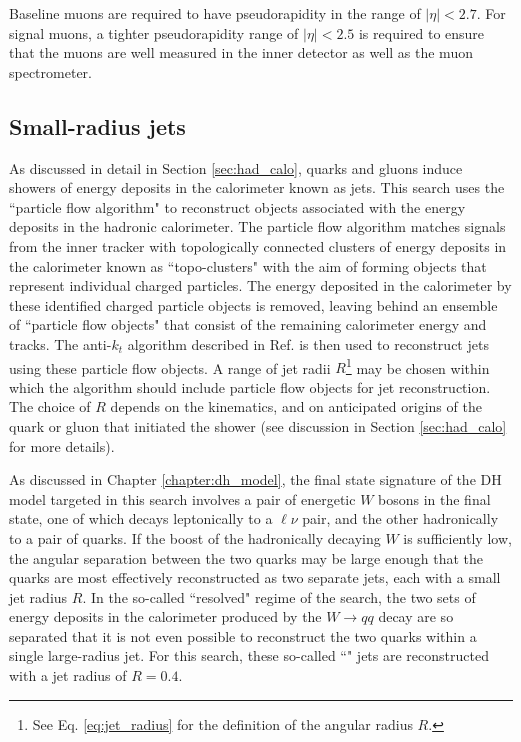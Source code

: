 Baseline muons are required to have pseudorapidity in the range of  \(|\eta| < 2.7\). For signal muons, a tighter pseudorapidity range of \(|\eta| < 2.5\) is required to ensure that the muons are well measured in the inner detector as well as the muon spectrometer. 

\subsection{Small-radius \aktfour jets}
\label{sec:atk4_jets}

As discussed in detail in Section \ref{sec:had_calo}, quarks and gluons induce showers of energy deposits in the calorimeter known as jets. This search uses the ``particle flow algorithm" \cite{PERF-2015-09} to reconstruct objects associated with the energy deposits in the hadronic calorimeter. The particle flow algorithm matches signals from the inner tracker with topologically connected clusters of energy deposits in the calorimeter known as ``topo-clusters" with the aim of forming objects that represent individual charged particles. The energy deposited in the calorimeter by these identified charged particle objects is removed, leaving behind an ensemble of ``particle flow objects" that consist of the remaining calorimeter energy and tracks. The anti-\(k_t\) algorithm described in Ref. \cite{akt_algo} is then used to reconstruct jets using these particle flow objects. A range of jet radii \(R\)\footnote{See Eq. \ref{eq:jet_radius} for the definition of the angular radius \(R\).} may be chosen within which the \akt algorithm should include particle flow objects for jet reconstruction. The choice of \(R\) depends on the kinematics, and on anticipated origins of the quark or gluon that initiated the shower (see discussion in Section \ref{sec:had_calo} for more details).

As discussed in Chapter \ref{chapter:dh_model}, the final state signature of the DH model targeted in this search involves a pair of energetic \(W\) bosons in the final state, one of which decays leptonically to a \(\ell\nu\) pair, and the other hadronically to a pair of quarks. If the boost of the hadronically decaying \(W\) is sufficiently low, the angular separation between the two quarks may be large enough that the quarks are most effectively reconstructed as two separate jets, each with a small jet radius \(R\). In the so-called ``resolved" regime of the search, the two sets of energy deposits in the calorimeter produced by the \(W\rightarrow qq\) decay are so separated that it is not even possible to reconstruct the two quarks within a single large-radius jet. For this search, these so-called ``\smallR" jets are reconstructed with a jet radius of \(R=0.4\).

